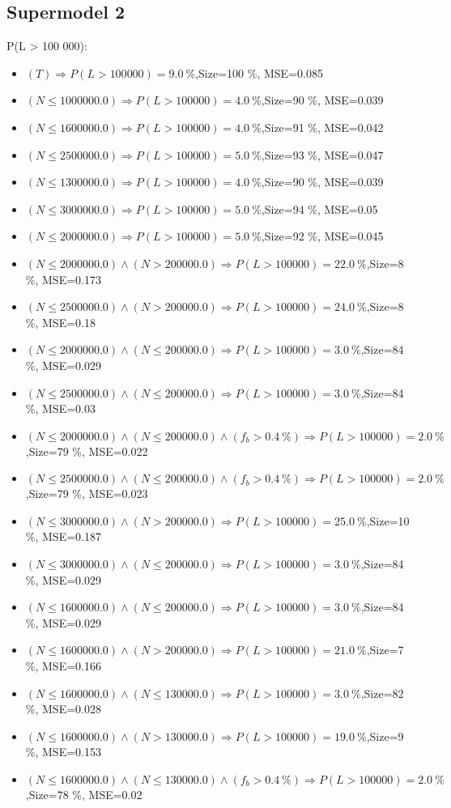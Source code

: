\documentclass[numbered]{CSL}
\begin{document}
\subsection{Supermodel 2}
P(L > 100 000):
\begin{itemize}
\item $(T) \Rightarrow P(L > 100 000) = 9.0~\%$,\hfill Size=100 \%, MSE=0.085
\item $(N \leq 1000000.0) \Rightarrow P(L > 100 000) = 4.0~\%$,\hfill Size=90 \%, MSE=0.039
\item $(N \leq 1600000.0) \Rightarrow P(L > 100 000) = 4.0~\%$,\hfill Size=91 \%, MSE=0.042
\item $(N \leq 2500000.0) \Rightarrow P(L > 100 000) = 5.0~\%$,\hfill Size=93 \%, MSE=0.047
\item $(N \leq 1300000.0) \Rightarrow P(L > 100 000) = 4.0~\%$,\hfill Size=90 \%, MSE=0.039
\item $(N \leq 3000000.0) \Rightarrow P(L > 100 000) = 5.0~\%$,\hfill Size=94 \%, MSE=0.05
\item $(N \leq 2000000.0) \Rightarrow P(L > 100 000) = 5.0~\%$,\hfill Size=92 \%, MSE=0.045
\item $(N \leq 2000000.0) \land (N > 200000.0) \Rightarrow P(L > 100 000) = 22.0~\%$,\hfill Size=8 \%, MSE=0.173
\item $(N \leq 2500000.0) \land (N > 200000.0) \Rightarrow P(L > 100 000) = 24.0~\%$,\hfill Size=8 \%, MSE=0.18
\item $(N \leq 2000000.0) \land (N \leq 200000.0) \Rightarrow P(L > 100 000) = 3.0~\%$,\hfill Size=84 \%, MSE=0.029
\item $(N \leq 2500000.0) \land (N \leq 200000.0) \Rightarrow P(L > 100 000) = 3.0~\%$,\hfill Size=84 \%, MSE=0.03
\item $(N \leq 2000000.0) \land (N \leq 200000.0) \land (f_b > 0.4~\%) \Rightarrow P(L > 100 000) = 2.0~\%$,\hfill Size=79 \%, MSE=0.022
\item $(N \leq 2500000.0) \land (N \leq 200000.0) \land (f_b > 0.4~\%) \Rightarrow P(L > 100 000) = 2.0~\%$,\hfill Size=79 \%, MSE=0.023
\item $(N \leq 3000000.0) \land (N > 200000.0) \Rightarrow P(L > 100 000) = 25.0~\%$,\hfill Size=10 \%, MSE=0.187
\item $(N \leq 3000000.0) \land (N \leq 200000.0) \Rightarrow P(L > 100 000) = 3.0~\%$,\hfill Size=84 \%, MSE=0.029
\item $(N \leq 1600000.0) \land (N \leq 200000.0) \Rightarrow P(L > 100 000) = 3.0~\%$,\hfill Size=84 \%, MSE=0.029
\item $(N \leq 1600000.0) \land (N > 200000.0) \Rightarrow P(L > 100 000) = 21.0~\%$,\hfill Size=7 \%, MSE=0.166
\item $(N \leq 1600000.0) \land (N \leq 130000.0) \Rightarrow P(L > 100 000) = 3.0~\%$,\hfill Size=82 \%, MSE=0.028
\item $(N \leq 1600000.0) \land (N > 130000.0) \Rightarrow P(L > 100 000) = 19.0~\%$,\hfill Size=9 \%, MSE=0.153
\item $(N \leq 1600000.0) \land (N \leq 130000.0) \land (f_b > 0.4~\%) \Rightarrow P(L > 100 000) = 2.0~\%$,\hfill Size=78 \%, MSE=0.02
\end{itemize}
\end{document}
